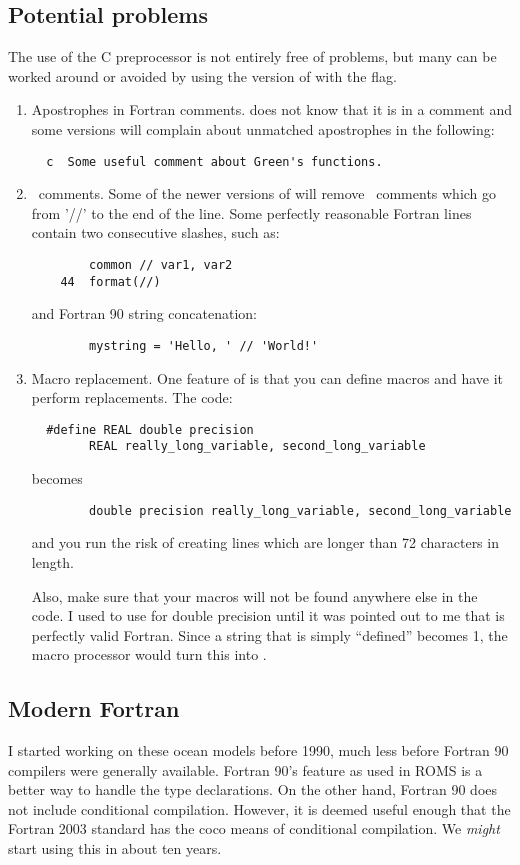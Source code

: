 \subsection{Potential problems}
The use of the C preprocessor is not entirely free of problems, but
many can be worked around or avoided by using the  version of
 with the  flag.
   \begin{enumerate}
     \item Apostrophes in Fortran comments.   does not
     know that it is in a comment and some versions will complain about
     unmatched apostrophes in the following:
     \begin{verbatim}
  c  Some useful comment about Green's functions.
     \end{verbatim}
     \item \CC\ comments.  Some of the newer versions of
      will remove \CC\ comments which go from '//' to
     the end of the line.  Some perfectly reasonable Fortran lines
     contain two consecutive slashes, such as:
     \begin{verbatim}
        common // var1, var2
    44  format(//)
     \end{verbatim}
     and Fortran 90 string concatenation:
     \begin{verbatim}
        mystring = 'Hello, ' // 'World!'
     \end{verbatim}
     \item Macro replacement.  One feature of  is that you
     can define macros and have it perform replacements.  The code:
     \begin{verbatim}
  #define REAL double precision
        REAL really_long_variable, second_long_variable
     \end{verbatim}
     becomes
     \begin{verbatim}
        double precision really_long_variable, second_long_variable
     \end{verbatim}
     and you run the risk of creating lines which are longer than 72
     characters in length.

     Also, make sure that your macros will not be found anywhere else
     in the code.  I used to use  for double
     precision until it was pointed out to me that 
      is perfectly valid Fortran.  Since a string
     that is simply ``defined'' becomes 1, the macro processor would
     turn this into .
  \end{enumerate}

\subsection{Modern Fortran}
I started working on these ocean models before 1990, much less before
Fortran 90 compilers were generally available.  Fortran 90's 
feature as used in ROMS is a better way to handle the 
type declarations.  On the other hand, Fortran 90 does not include
conditional compilation.  However, it is deemed useful enough that the
Fortran 2003 standard has the coco means of conditional compilation.
We {\em might} start using this in about ten years.

